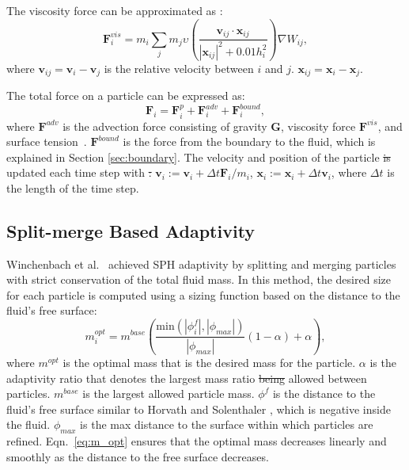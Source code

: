 \documentclass[VANCOUVER,STIX1COL]{WileyNJD-v2}
\providecommand{\DIFadd}[1]{{\protect\color{blue}\uwave{#1}}} %
\providecommand{\DIFdel}[1]{{\protect\color{red}\sout{#1}}}                      %
\providecommand{\DIFaddbegin}{} %
\providecommand{\DIFaddend}{} %
\providecommand{\DIFdelbegin}{} %
\providecommand{\DIFdelend}{} %
\begin{document}
The viscosity force can be approximated as \DIFaddbegin \DIFadd{follows}\DIFaddend :
\begin{equation}
    \mathbf{F}_i^{vis} = 
    m_i \sum_j m_j \upsilon \left(\frac{\mathbf{v}_{ij}\cdot\mathbf{x}_{ij}}{|\mathbf{x}_{ij}|^2 + 0.01h_i^2}\right)\nabla W_{ij},
    \label{eq:vis}
\end{equation}
where $\mathbf{v}_{ij} = \mathbf{v}_i - \mathbf{v}_j$ is the relative velocity between $i$ and $j$. $\mathbf{x}_{ij} = \mathbf{x}_i - \mathbf{x}_j$.

The total force on a particle can be expressed as:
\begin{equation}
    \mathbf{F}_i = \mathbf{F}_i^p + \mathbf{F}_i^{adv} + \mathbf{F}_i^{bound},
\end{equation}
where $\mathbf{F}^{adv}$ is the advection force consisting of gravity $\mathbf{G}$, viscosity force $\mathbf{F}^{vis}$, and surface tension~\cite{Akinci13}. $\mathbf{F}^{bound}$ is the force from the boundary to the fluid, which is explained in Section \ref{sec:boundary}. The velocity and position of the particle \DIFdelbegin \DIFdel{is }\DIFdelend \DIFaddbegin \DIFadd{are }\DIFaddend updated each time step with \DIFdelbegin \DIFdel{: }\DIFdelend $\mathbf{v}_i := \mathbf{v}_i + \Delta t \mathbf{F}_i / m_i$, $\mathbf{x}_i := \mathbf{x}_i + \Delta t \mathbf{v}_i$, where $\Delta t$ is the length of the time step.

\subsection{Split-merge Based Adaptivity}

Winchenbach et al.~\cite{Winchenbach17} achieved SPH adaptivity by splitting and merging particles with strict conservation of the total fluid mass. In this method, the desired size for each particle is computed using a sizing function based on the distance to the fluid's free surface:
\begin{equation}
    m_i^{opt} = m^{base}\left(
    \frac{\mathrm{min}(|\phi_i^f|,|\phi_{max}|)}{|\phi_{max}|}
    (1 - \alpha) + \alpha
    \right),
    \label{eq:m_opt}
\end{equation}
where $m^{opt}$ is the optimal mass that is the desired mass for the particle. $\alpha$ is the adaptivity ratio that denotes the largest mass ratio \DIFdelbegin \DIFdel{being }\DIFdelend allowed between particles. $m^{base}$ is the largest allowed particle mass. $\phi^f$ is the distance to the fluid's free surface similar to Horvath and Solenthaler \cite{Horvath13}, which is negative inside the fluid. $\phi_{max}$ is the max distance to the surface within which particles are refined. Eqn.~\ref{eq:m_opt} ensures that the optimal mass decreases linearly and smoothly as the distance to the free surface decreases.
\end{document}
